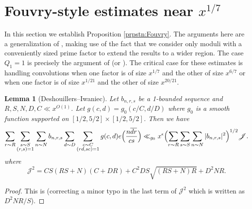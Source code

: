 \documentclass[10pt]{amsart}
\theoremstyle{plain}
\newtheorem{lmm}[thrm]{Lemma}
\numberwithin{equation}{section}
\begin{document}
\section{Fouvry-style estimates near \texorpdfstring{$x^{1/7}$}{x\^{}(1/7)}}\label{sec:Fouvry}
%
%
%
%
In this section we establish Proposition \ref{prpstn:Fouvry}. The arguments here are a generalization of \cite{Fouvry}, making use of the fact that we consider only moduli with a conveniently sized prime factor to extend the results to a wider region. The case $Q_1=1$ is precisely the argument of \cite{Fouvry} (or \cite[Theorem 3]{BFI1}). The critical case for these estimates is handling convolutions when one factor is of size $x^{1/7}$ and the other of size $x^{6/7}$ or when one factor is of size $x^{1/21}$ and the other of size $x^{20/21}$.
\begin{lmm}[Deshouillers--Iwaniec]\label{lmm:DeshouillersIwaniec}
Let $b_{n,r,s}$ be a 1-bounded sequence and $R,S,N,D,C\ll x^{O(1)}$. Let $g(c,d)=g_0(c/C,d/D)$ where $g_0$ is a smooth function supported on $[1/2,5/2]\times [1/2,5/2]$. Then we have
\[
\sum_{r\sim R} \sum_{\substack{s\sim S\\ (r,s)=1}}\sum_{n\sim N}b_{n,r,s}\sum_{d\sim D}\sum_{\substack{c\sim C\\ (rd,sc)=1}}g(c,d) e\Bigl(\frac{n\overline{dr}}{cs}\Bigr)\ll_{g_0} x^\epsilon \Bigl(\sum_{r\sim R}\sum_{s\sim S}\sum_{n\sim N}|b_{n,r,s}|^2\Bigr)^{1/2}\mathscr{J}.
\]
where
\[
\mathscr{J}^2=CS(RS+N)(C+DR)+C^2 D S\sqrt{(RS+N)R}+D^2NR.
\]
\end{lmm}
%
%
%
%
\begin{proof}
This is \cite[Theorem 12]{DeshouillersIwaniec} (correcting a minor typo in the last term of $\mathscr{J}^2$ which is written as $D^2NR/S$).
\end{proof}
%
%
%
%
%
%
%
%
\end{document}
